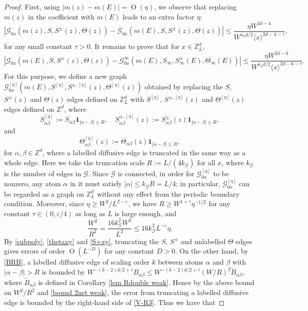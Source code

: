 \documentclass{article}
\newcommand{\1}{\mathds{1}}
\numberwithin{equation}{section}
\newcommand{\al}{\alpha}
\newcommand{\be}{\begin{equation}}
\newcommand{\ee}{\end{equation}}
\newcommand{\e}{{\varepsilon}}
\renewcommand{\cal}{\mathcal}
\newcommand{\wt}{\widetilde}
\renewcommand{\leq}{\leqslant}
\renewcommand{\geq}{\geqslant}
\renewcommand{\le}{\leq}
\renewcommand{\ge}{\geq}
\newcommand{\Z}{\mathbb{Z}}
\newcommand{\dashed}{\text{diffusive}}
\DeclareMathOperator{\OO}{O}
\theoremstyle{plain} %
\theoremstyle{remark}
\begin{document}
\begin{proof}
First, using $|m(z)-m(E)|=\OO(\eta)$, we observe that replacing $m(z)$ in the coefficient with $m(E)$ leads to an extra factor $\eta$: %
$$\left|\cal G_{0x}(m(z),S , S^{\pm}(z),\Theta(z))-\cal G_{0x}( m(E), S , S^{\pm}(z),\Theta(z))\right| \le  \frac{ \eta W^{2d-4}}{W^{n_0d/2}\langle x \rangle^{2d-4-\tau}},$$
 for any small constant $\tau>0$. It remains to prove that for $x\in \Z_L^d$,
\be  \label{V-R3}
\left|\cal G_{0x}(m(E),S, S^{\pm}(z),\Theta(z))-\cal G^\infty_{0x}( m(E), S_\infty,  S_\infty^{\pm}(E), \Theta_\infty(E))\right| \le \frac{\eta W^{2d-6}}{W^{n_0d/2} \langle x\rangle^{2d-6-\tau}}.
\ee
For this purpose, we define a new graph $ {\cal G}^{[\eta]}_{0x}(m(E),S^{[\eta]}, S^{\pm,[\eta]}(z),\Theta^{[\eta]}(z))$ obtained by replacing the $S$, $S^\pm(z)$ and $\Theta(z)$ edges defined on $\Z_L^d$ with $S^{[\eta]}$, $S^{\pm,[\eta]}(z)$ and $\Theta^{[\eta]}(z)$ edges defined on $\Z^d$, where %
$$ S^{[\eta]}_{\al\beta}:=S_{ \al \beta } \mathbf 1_{|\al-\beta|\le R},\quad S^{\pm, [\eta]}_{\al\beta}(z):=S^{\pm}_{ \al \beta } (z)\mathbf 1_{|\al-\beta|\le R}, $$
and
$$ \Theta^{[\eta]}_{\al\beta}(z):=\Theta_{ \al \beta }(z)\mathbf 1_{|\al-\beta|\le R},$$
for $\al,\beta\in \Z^d$, where a labelled $\dashed$ edge is truncated in the same way as a whole edge. Here we take the truncation scale $R:=L/(4k_{\cal G})$ for all $x$, where $k_{\cal G}$ is the number of edges in $\cal G$. Since $\cal G$ is connected, in order for {$\cal G_{0x}^{[\eta]}$} to be nonzero, any atom $\al$ in it must satisfy $|\al |\le k_{\cal G}R= L/4$; in particular, ${\cal G}^{[\eta]}_{0x}$ can be regarded as a graph on $\Z_L^d$ without any effect from the periodic boundary condition. Moreover, since $\eta\ge W^2/L^{2-\e}$, we have $R\ge W^{1+\tau}\eta^{-1/2}$ for any constant $\tau\in (0,\e/4)$ as long as $L$ is large enough, and
$$
\frac{W^2}{R^2}=\frac{16k_{\cal G}^2W^2}{L^2}\le 16k_{\cal G}^2L^{-\e}\eta .
$$
By \eqref{subpoly}, \eqref{thetaxy} and \eqref{S+xy}, truncating the $S$, $S^\pm$ and unlabelled $\Theta$ edges gives errors of order $\OO(L^{-D})$ for any constant $D>0$. On the other hand, by \eqref{BRB}, a labelled $\dashed$ edge of scaling order $k$ between atoms $\al$ and $\beta$ with $|\al-\beta|>R$ is bounded by $W^{-(k-2)d/2+\tau}B_{\al\beta}\le W^{-(k-2)d/2+\tau}(W/R)^2\wt B_{\al\beta}$, where $\wt B_{\al\beta}$ is defined in Corollary \ref{lem Rdouble weak}. Hence by the above bound on $W^2/R^2$ and \eqref{bound 2net weak}, the error from truncating a labelled $\dashed$ edge is bounded by the right-hand side of \eqref{V-R3}. Thus we have that

\end{proof}
\end{document}
